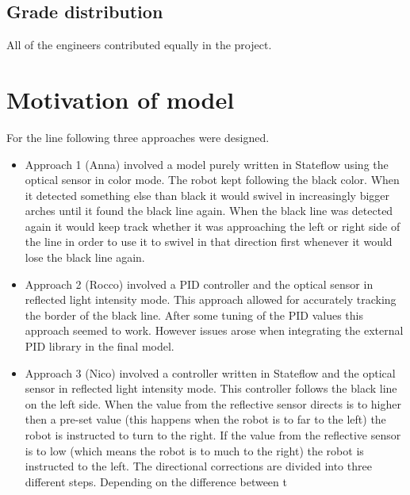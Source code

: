 \documentclass[a4paper,12pt]{article}
\begin{document}
\subsection{Grade distribution}
All of the engineers contributed equally in the project. 
\section{Motivation of model}
For the line following three approaches were designed. 
\begin{itemize}
    \item Approach 1 (Anna) involved a model purely written in Stateflow using the optical sensor in color mode. The robot kept following the black color. When it detected something else than black it would swivel in increasingly bigger arches until it found the black line again. When the black line was detected again it would keep track whether it was approaching the left or right side of the line in order to use it to swivel in that direction first whenever it would lose the black line again.
    \item Approach 2 (Rocco) involved a PID controller and the optical sensor in reflected light intensity mode. This approach allowed for accurately tracking the border of the black line. After some tuning of the PID values this approach seemed to work. However issues arose when integrating the external PID library in the final model.
    \item Approach 3 (Nico) involved a controller written in Stateflow and the optical sensor in reflected light intensity mode. This controller follows the black line on the left side. When the value from the reflective sensor directs is to higher then a pre-set value (this happens when the robot is to far to the left) the robot is instructed to turn to the right. If the value from the reflective sensor is to low (which means the robot is to much to the right) the robot is instructed to the left. The directional corrections are divided into three different steps. Depending on the difference between t
\end{itemize}



\end{document}
